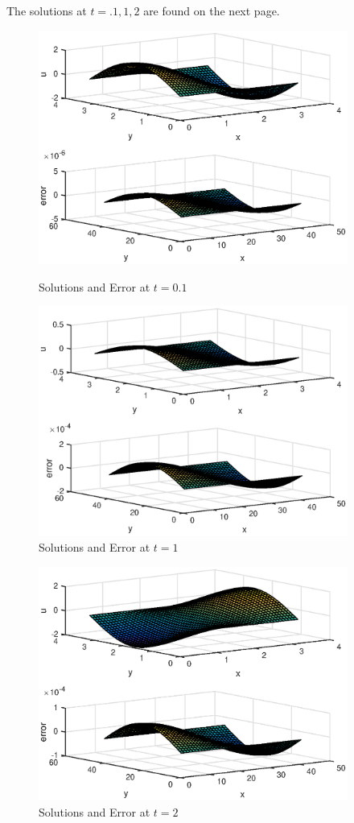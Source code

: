 The solutions at $t=.1,1,2$ are found on the next page.
\begin{figure}
\centering
\includegraphics[width=4in]{solnt01}
\caption{Solutions and Error at $t=0.1$}
\includegraphics[width=4in]{solnt1}\\
\caption{Solutions and Error at $t=1$}
\includegraphics[width=4in]{sonlt2}
\caption{Solutions and Error at $t=2$}
\end{figure}

